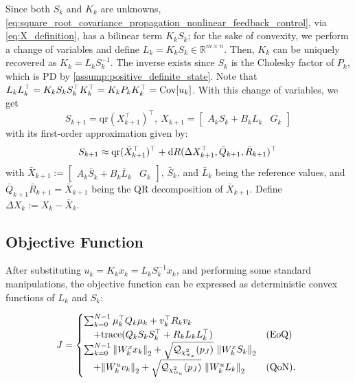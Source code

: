 Since both $S_k$ and $K_k$ are unknowns, \cref{eq:square_root_covariance_propagation_nonlinear_feedback_control}, via \cref{eq:X_definition}, has a bilinear term \( K_k S_k \); for the sake of convexity, we perform a change of variables and define $L_k = K_k S_k \in \mathbb{R}^{m \times n}$. Then, $K_k$ can be uniquely recovered as $K_k = L_k S_k^{-1}$. The inverse exists since $S_k$ is the Cholesky factor of \( P_k \), which is PD by \cref{assump:positive_definite_state}. Note that $L_k L_k^\top = K_k S_k S_k^\top K_k^\top = K_k P_k K_k^\top = \mathrm{Cov}[u_k ]$. With this change of variables, we get
\begin{equation} \label{eq:square_root_covariance_propagation}
	S_{k+1} = \mathrm{qr}(X_{k+1}^\top)^\top, \ X_{k+1} = \begin{bmatrix} A_k S_k + B_k L_k & G_k \end{bmatrix}
\end{equation}
with its first-order approximation given by:
\begin{equation} \label{eq:square_root_covariance_propagation_linearized}
	\hspace{-1pt}S_{k+1} \approx \mathrm{qr}(\bar{X}_{k+1}^\top)^\top + \dd R( \Delta X_{k+1}^\top , \bar{Q}_{k+1}, \bar{R}_{k+1})^\top
\end{equation}
with \( \bar{X}_{k+1} := \begin{bmatrix} A_k \bar{S}_k + B_k \bar{L}_k & G_k \end{bmatrix} \), \(\bar{S}_k\), and \(\bar{L}_k\) being the reference values, and \(\bar{Q}_{k+1} \bar{R}_{k+1} = \bar{X}_{k+1}\) being the QR decomposition of \(\bar{X}_{k+1}\). 
Define $\Delta X_{k} := X_k - \bar{X}_k$.

\subsection{Objective Function}
After substituting \( u_k = K_k x_k = L_k S_k^{-1} x_k \), and performing some standard manipulations, the objective function can be expressed as deterministic convex functions of \( L_k \) and \( S_k \):

{
\setlength{\abovedisplayskip}{0pt} %
\setlength{\belowdisplayskip}{0pt} %
\small
\begin{equation} \label{eq:objective_deterministic}
	\hspace{-3pt}
	J = \begin{cases}
	\sum_{k=0}^{N-1} \mu_k^\top Q_k \mu_k + v_k^\top R_k v_k & \\
	\quad + \mathrm{trace} (Q_k S_k S_k^\top + R_k L_k L_k^\top) & \text{(EoQ)} \\
	\sum_{k=0}^{N-1} \norm{W_k^x x_k}_2 + \sqrt{\mathcal{Q}_{\chi^2_{w_x}}(p_J)} \ \norm{W_k^x S_k}_2 & \\
	\quad + \norm{W_k^u v_k}_2 + \sqrt{\mathcal{Q}_{\chi^2_{w_u}}(p_J)} \ \norm{W_k^u L_k}_2 & \text{(QoN)}.
	\end{cases}
\end{equation}
\setlength{\abovedisplayskip}{0pt} %
\setlength{\belowdisplayskip}{0pt} %
}

